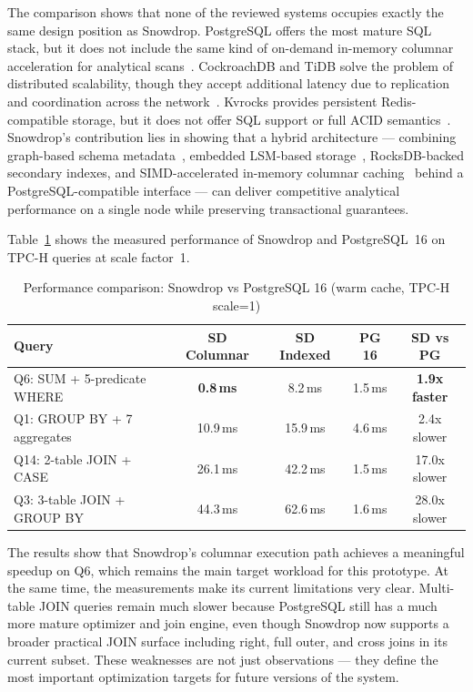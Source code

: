 The comparison shows that none of the reviewed systems occupies exactly the same design position as Snowdrop. PostgreSQL offers the most mature SQL stack, but it does not include the same kind of on-demand in-memory columnar acceleration for analytical scans~\cite{abadi2013}. CockroachDB and TiDB solve the problem of distributed scalability, though they accept additional latency due to replication and coordination across the network~\cite{corbett2012}. Kvrocks provides persistent Redis-compatible storage, but it does not offer SQL support or full ACID semantics~\cite{kvrocks2025}. Snowdrop’s contribution lies in showing that a hybrid architecture --- combining graph-based schema metadata~\cite{robinson2015}, embedded LSM-based storage~\cite{luo2019}, RocksDB-backed secondary indexes, and SIMD-accelerated in-memory columnar caching~\cite{zhou2002} behind a PostgreSQL-compatible interface --- can deliver competitive analytical performance on a single node while preserving transactional guarantees.

Table~\ref{tab:perf-comparison} shows the measured performance of Snowdrop and PostgreSQL~16 on TPC-H queries at scale factor~1.

\begin{table}[H]
\centering
\caption{Performance comparison: Snowdrop vs PostgreSQL 16 (warm cache, TPC-H scale=1)}
\label{tab:perf-comparison}
\renewcommand{\arraystretch}{1.4}
\begin{tabular}{|p{5cm}|c|c|c|c|}
\hline
\textbf{Query} & \textbf{SD Columnar} & \textbf{SD Indexed} & \textbf{PG 16} & \textbf{SD vs PG} \\
\hline
Q6: SUM + 5-predicate WHERE  & \textbf{0.8\,ms} & 8.2\,ms & 1.5\,ms & \textbf{1.9x faster} \\
\hline
Q1: GROUP BY + 7 aggregates  & 10.9\,ms & 15.9\,ms & 4.6\,ms & 2.4x slower \\
\hline
Q14: 2-table JOIN + CASE     & 26.1\,ms & 42.2\,ms & 1.5\,ms & 17.0x slower \\
\hline
Q3: 3-table JOIN + GROUP BY  & 44.3\,ms & 62.6\,ms & 1.6\,ms & 28.0x slower \\
\hline
\end{tabular}
\end{table}

The results show that Snowdrop’s columnar execution path achieves a meaningful speedup on Q6, which remains the main target workload for this prototype. At the same time, the measurements make its current limitations very clear. Multi-table JOIN queries remain much slower because PostgreSQL still has a much more mature optimizer and join engine, even though Snowdrop now supports a broader practical JOIN surface including right, full outer, and cross joins in its current subset. These weaknesses are not just observations --- they define the most important optimization targets for future versions of the system.
